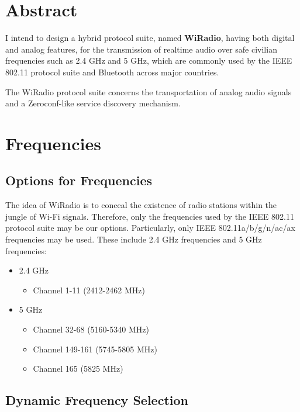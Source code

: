\documentclass[a4paper,11pt]{article}
\begin{document}

\fulldoctitle


\section*{Abstract}

I intend to design a hybrid protocol suite, named \textbf{WiRadio}, having both digital and analog features,
for the transmission of realtime audio over safe civilian frequencies such as 2.4 GHz and 5 GHz,
which are commonly used by the IEEE 802.11 protocol suite and Bluetooth across major countries.

The WiRadio protocol suite concerns the transportation of analog audio signals and
a Zeroconf-like service discovery mechanism.

\tableofcontents
\clearpage


\section{Frequencies}

\subsection{Options for Frequencies}

The idea of WiRadio is to conceal the existence of radio stations within the jungle of Wi-Fi signals.
Therefore, only the frequencies used by the IEEE 802.11 protocol suite may be our options.
Particularly, only IEEE 802.11a/b/g/n/ac/ax frequencies may be used.
These include 2.4 GHz frequencies and 5 GHz frequencies:

\begin{itemize}
	\item 2.4 GHz
	      \begin{itemize}
		      \item Channel 1-11 (2412-2462 MHz)
	      \end{itemize}
	\item 5 GHz
	      \begin{itemize}
		      \item Channel 32-68 (5160-5340 MHz)
		      \item Channel 149-161 (5745-5805 MHz)
		      \item Channel 165 (5825 MHz)
	      \end{itemize}
\end{itemize}

\subsection{Dynamic Frequency Selection}
\end{document}

